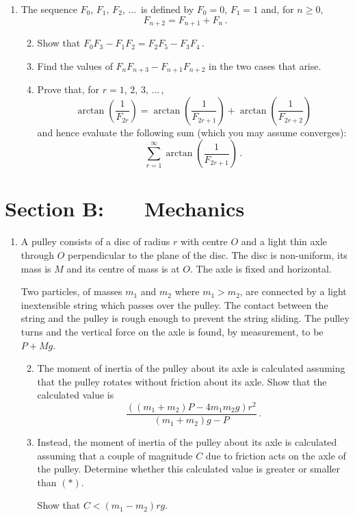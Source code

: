 \documentclass[a4, 11pt]{report}
\newlength{\qspace}
\newcounter{qnumber}
\newenvironment{question}%
 {\vspace{\qspace}
  \begin{enumerate}[\bfseries 1\quad][10]%
    \setcounter{enumi}{\value{qnumber}}%
    \item%
 }
{
  \end{enumerate}
  \filbreak
  \stepcounter{qnumber}
 }
\newenvironment{questionparts}[1][1]%
 {
  \begin{enumerate}[\bfseries (i)]%
    \setcounter{enumii}{#1}
    \addtocounter{enumii}{-1}
    \setlength{\itemsep}{5mm}
    \setlength{\parskip}{8pt}
 }
 {
  \end{enumerate}
 }
\def\ge{\geqslant}
\begin{document}
\begin{question}
The sequence $F_0$, $F_1$, $F_2$, $\ldots\,$ is defined
by $F_0=0$, $F_1=1$ and, for $n\ge0$,
\[
F_{n+2} = F_{n+1} + F_n
\,.
\]

\begin{questionparts}
\item Show that $F_0F_3-F_1F_2 = F_2F_5- F_3F_4\,$.
\item
Find the values of $F_nF_{n+3} - F_{n+1}F_{n+2}$
in the two cases that arise.
\item 
Prove that, for $r=1$, $2$, $3$, $\ldots\,$, 
\[
\arctan \left( \frac 1{F_{2r}}\right)
=\arctan \left( \frac 1{F_{2r+1}}\right)+
\arctan \left( \frac 1{F_{2r+2}}\right)
\]
and hence evaluate the following sum (which you may assume converges): 
\[
\sum_{r=1}^\infty \arctan \left( \frac 1{F_{2r+1}}\right)
\,.
\]
\end{questionparts}
\end{question}	
		

		
	
\newpage
\section*{Section B: \ \ \ Mechanics}


	
\begin{question}
A pulley consists of a disc of radius $r$
with centre $O$
and a light thin axle through $O$ perpendicular
to the plane of the disc. The disc is non-uniform,
its  mass  is $M$  and its
centre of mass is at $O$. The
 axle is fixed and horizontal.


Two particles, of masses $m_1$ and $m_2$ where $m_1>m_2$,
are connected by a light inextensible string which passes over
the pulley. 
The contact between the string 
and the pulley is rough enough to prevent the string sliding. 
The pulley turns and  the vertical force on the axle is
 found, by measurement, to be~$P+Mg$. 
\begin{questionparts}
\item
The moment of inertia of the pulley about its axle is calculated 
assuming that the pulley rotates without friction about its axle. 
Show that the calculated value is
\[
\frac{((m_1 + m_2)P - 4m_1m_2g)r^2}
{(m_1 + m_2)g - P}\,.
\tag{$*$}\]
 \item
Instead, the moment of inertia of the pulley about its axle
is calculated
assuming that a couple of magnitude $C$ due to      
friction acts on the axle of the pulley. 
Determine whether
this calculated value  is greater or 
smaller than $(*)$.

Show that $C<(m_1-m_2)rg$.
\end{questionparts}
	\end{question}
	
\end{document}
